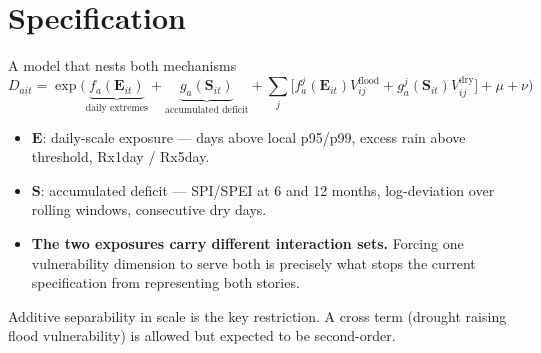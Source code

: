 \documentclass[10pt, aspectratio=169]{beamer}
\begin{document}
\section{Specification}

\begin{frame}{A model that nests both mechanisms}
  \[
    D_{ait} = \exp\Big(
      \underbrace{f_a(\mathbf{E}_{it})}_{\text{daily extremes}} +
      \underbrace{g_a(\mathbf{S}_{it})}_{\text{accumulated deficit}} +
      \sum_j \big[ f^j_a(\mathbf{E}_{it}) V^{\text{flood}}_{ij}
                 + g^j_a(\mathbf{S}_{it}) V^{\text{dry}}_{ij} \big]
      + \mu + \nu \Big)
  \]
  \begin{itemize}
    \item $\mathbf{E}$: daily-scale exposure --- days above local p95/p99,
          excess rain above threshold, Rx1day / Rx5day.
    \item $\mathbf{S}$: accumulated deficit --- SPI/SPEI at 6 and 12 months,
          log-deviation over rolling windows, consecutive dry days.
    \item \textbf{The two exposures carry different interaction sets.} Forcing
          one vulnerability dimension to serve both is precisely what stops
          the current specification from representing both stories.
  \end{itemize}
  \vspace{0.3em}
  {\scriptsize Additive separability in scale is the key restriction. A cross
  term (drought raising flood vulnerability) is allowed but expected to be
  second-order.}
\end{frame}
\end{document}
